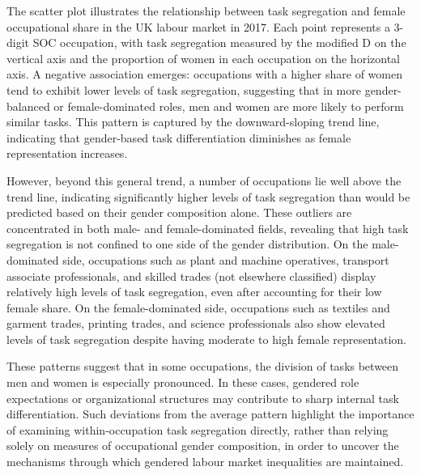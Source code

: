 The scatter plot illustrates the relationship between task segregation and female occupational share 
in the UK labour market in 2017. Each point represents a 3-digit SOC occupation, with task segregation 
measured by the modified D on the vertical axis and the proportion of women in each occupation 
on the horizontal axis. A negative association emerges: occupations with a higher share of women 
tend to exhibit lower levels of task segregation, suggesting that in more gender-balanced or female-dominated 
roles, men and women are more likely to perform similar tasks. This pattern is captured by the downward-sloping 
trend line, indicating that gender-based task differentiation diminishes as female representation increases.

However, beyond this general trend, a number of occupations lie well above the trend line, indicating 
significantly higher levels of task segregation than would be predicted based on their gender composition 
alone. These outliers are concentrated in both male- and female-dominated fields, revealing that high task 
segregation is not confined to one side of the gender distribution. On the male-dominated side, occupations 
such as plant and machine operatives, transport associate professionals, and skilled trades (not elsewhere classified) 
display relatively high levels of task segregation, even after accounting for their low female share. 
On the female-dominated side, occupations such as textiles and garment trades, printing trades, and science 
professionals also show elevated levels of task segregation despite having moderate to high female representation.

These patterns suggest that in some occupations, the division of tasks between men and women is especially 
pronounced. In these cases, gendered role 
expectations or organizational structures may contribute to sharp internal task differentiation. 
Such deviations from the average pattern highlight the importance of examining within-occupation task 
segregation directly, rather than relying solely on measures of occupational gender composition, in order 
to uncover the mechanisms through which gendered labour market inequalities are maintained.